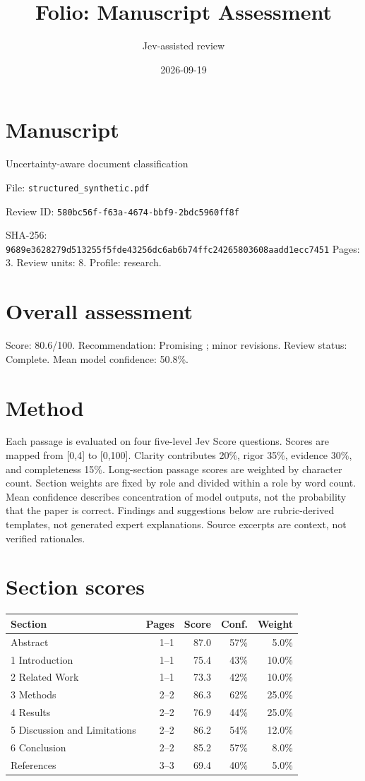 \documentclass[11pt]{article}
\title{Folio: Manuscript Assessment}
\author{Jev-assisted review}
\date{2026-09-19}
\begin{document}
\maketitle
\section{Manuscript}
Uncertainty-aware document classification
\par File: \texttt{structured\_synthetic.pdf}
\par Review ID: \texttt{580bc56f-f63a-4674-bbf9-2bdc5960ff8f}
\par SHA-256: \texttt{9689e3628279d513255f5fde43256dc6}\allowbreak\texttt{ab6b74ffc24265803608aadd1ecc7451}
Pages: 3. Review units: 8. Profile: research.
\section{Overall assessment}
Score: 80.6/100. Recommendation: Promising ; minor revisions.
Review status: Complete. Mean model confidence: 50.8\%.
\section{Method}
Each passage is evaluated on four five-level Jev Score questions. Scores are mapped from [0,4] to [0,100]. Clarity contributes 20\%, rigor 35\%, evidence 30\%, and completeness 15\%. Long-section passage scores are weighted by character count. Section weights are fixed by role and divided within a role by word count. Mean confidence describes concentration of model outputs, not the probability that the paper is correct. Findings and suggestions below are rubric-derived templates, not generated expert explanations. Source excerpts are context, not verified rationales.
\section{Section scores}
\begin{longtable}{p{}rrrr}
\toprule Section & Pages & Score & Conf. & Weight \\ \midrule\endhead
Abstract & 1--1 & 87.0 & 57\% & 5.0\% \\
1 Introduction & 1--1 & 75.4 & 43\% & 10.0\% \\
2 Related Work & 1--1 & 73.3 & 42\% & 10.0\% \\
3 Methods & 2--2 & 86.3 & 62\% & 25.0\% \\
4 Results & 2--2 & 76.9 & 44\% & 25.0\% \\
5 Discussion and Limitations & 2--2 & 86.2 & 54\% & 12.0\% \\
6 Conclusion & 2--2 & 85.2 & 57\% & 8.0\% \\
References & 3--3 & 69.4 & 40\% & 5.0\% \\
\bottomrule\end{longtable}
\end{document}
